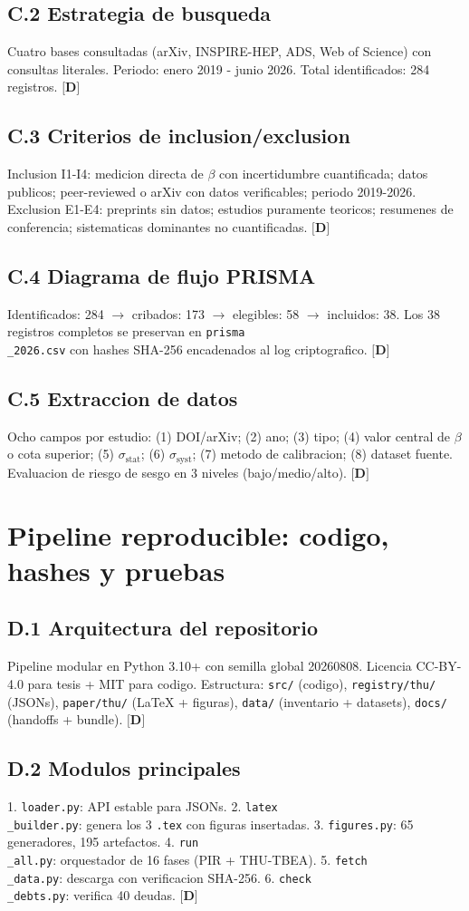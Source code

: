 ﻿\documentclass[11pt,letterpaper]{article}
\begin{document}
\subsection{C.2 Estrategia de busqueda}
Cuatro bases consultadas (arXiv, INSPIRE-HEP, ADS, Web of Science) con consultas literales. Periodo: enero 2019 - junio 2026. Total identificados: 284 registros. $\textbf{[D]}$
\subsection{C.3 Criterios de inclusion/exclusion}
Inclusion I1-I4: medicion directa de $\beta$ con incertidumbre cuantificada; datos publicos; peer-reviewed o arXiv con datos verificables; periodo 2019-2026. Exclusion E1-E4: preprints sin datos; estudios puramente teoricos; resumenes de conferencia; sistematicas dominantes no cuantificadas. $\textbf{[D]}$
\subsection{C.4 Diagrama de flujo PRISMA}
Identificados: 284 $\to$ cribados: 173 $\to$ elegibles: 58 $\to$ incluidos: 38. Los 38 registros completos se preservan en \texttt{prisma\\\_2026.csv} con hashes SHA-256 encadenados al log criptografico. $\textbf{[D]}$
\subsection{C.5 Extraccion de datos}
Ocho campos por estudio: (1) DOI/arXiv; (2) ano; (3) tipo; (4) valor central de $\beta$ o cota superior; (5) $\sigma_{\mathrm{stat}}$; (6) $\sigma_{\mathrm{syst}}$; (7) metodo de calibracion; (8) dataset fuente. Evaluacion de riesgo de sesgo en 3 niveles (bajo/medio/alto). $\textbf{[D]}$
\section{Pipeline reproducible: codigo, hashes y pruebas}
\subsection{D.1 Arquitectura del repositorio}
Pipeline modular en Python 3.10+ con semilla global 20260808. Licencia CC-BY-4.0 para tesis + MIT para codigo. Estructura: \texttt{src/} (codigo), \texttt{registry/thu/} (JSONs), \texttt{paper/thu/} (LaTeX + figuras), \texttt{data/} (inventario + datasets), \texttt{docs/} (handoffs + bundle). $\textbf{[D]}$
\subsection{D.2 Modulos principales}
1. \texttt{loader.py}: API estable para JSONs. 2. \texttt{latex\\\_builder.py}: genera los 3 \texttt{.tex} con figuras insertadas. 3. \texttt{figures.py}: 65 generadores, 195 artefactos. 4. \texttt{run\\\_all.py}: orquestador de 16 fases (PIR + THU-TBEA). 5. \texttt{fetch\\\_data.py}: descarga con verificacion SHA-256. 6. \texttt{check\\\_debts.py}: verifica 40 deudas. $\textbf{[D]}$
\end{document}
